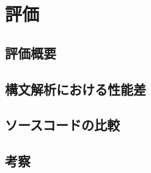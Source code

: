 \chapter{評価}
\label{evaluation}

\section{評価概要}

\section{構文解析における性能差}

\section{ソースコードの比較}

\section{考察}


